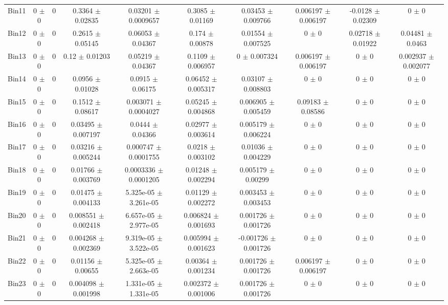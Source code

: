 \begin{tabular}{@{\extracolsep{4pt}}lccccccccc@{}}
     Bin11 & 0 $\pm$ 0 & 0 & 0.3364 $\pm$ 0.02835 & 0.03201 $\pm$ 0.0009657 & 0.3085 $\pm$ 0.01169 & 0.03453 $\pm$ 0.009766 & 0.006197 $\pm$ 0.006197 & -0.0128 $\pm$ 0.02309 & 0 $\pm$ 0 \\ 
     Bin12 & 0 $\pm$ 0 & 0 & 0.2615 $\pm$ 0.05145 & 0.06053 $\pm$ 0.04367 & 0.174 $\pm$ 0.00878 & 0.01554 $\pm$ 0.007525 & 0 $\pm$ 0 & 0.02718 $\pm$ 0.01922 & 0.04481 $\pm$ 0.0463 \\ 
     Bin13 & 0 $\pm$ 0 & 0 & 0.12 $\pm$ 0.01203 & 0.05219 $\pm$ 0.04367 & 0.1109 $\pm$ 0.006957 & 0 $\pm$ 0.007324 & 0.006197 $\pm$ 0.006197 & 0 $\pm$ 0 & 0.002937 $\pm$ 0.002077 \\ 
     Bin14 & 0 $\pm$ 0 & 0 & 0.0956 $\pm$ 0.01028 & 0.0915 $\pm$ 0.06175 & 0.06452 $\pm$ 0.005317 & 0.03107 $\pm$ 0.008803 & 0 $\pm$ 0 & 0 $\pm$ 0 & 0 $\pm$ 0 \\ 
     Bin15 & 0 $\pm$ 0 & 0 & 0.1512 $\pm$ 0.08617 & 0.003071 $\pm$ 0.0004027 & 0.05245 $\pm$ 0.004868 & 0.006905 $\pm$ 0.005459 & 0.09183 $\pm$ 0.08586 & 0 $\pm$ 0 & 0 $\pm$ 0 \\ 
     Bin16 & 0 $\pm$ 0 & 0 & 0.03495 $\pm$ 0.007197 & 0.0444 $\pm$ 0.04366 & 0.02977 $\pm$ 0.003614 & 0.005179 $\pm$ 0.006224 & 0 $\pm$ 0 & 0 $\pm$ 0 & 0 $\pm$ 0 \\ 
     Bin17 & 0 $\pm$ 0 & 0 & 0.03216 $\pm$ 0.005244 & 0.000747 $\pm$ 0.0001755 & 0.0218 $\pm$ 0.003102 & 0.01036 $\pm$ 0.004229 & 0 $\pm$ 0 & 0 $\pm$ 0 & 0 $\pm$ 0 \\ 
     Bin18 & 0 $\pm$ 0 & 0 & 0.01766 $\pm$ 0.003769 & 0.0003336 $\pm$ 0.0001205 & 0.01248 $\pm$ 0.002294 & 0.005179 $\pm$ 0.00299 & 0 $\pm$ 0 & 0 $\pm$ 0 & 0 $\pm$ 0 \\ 
     Bin19 & 0 $\pm$ 0 & 0 & 0.01475 $\pm$ 0.004133 & 5.325e-05 $\pm$ 3.261e-05 & 0.01129 $\pm$ 0.002272 & 0.003453 $\pm$ 0.003453 & 0 $\pm$ 0 & 0 $\pm$ 0 & 0 $\pm$ 0 \\ 
     Bin20 & 0 $\pm$ 0 & 0 & 0.008551 $\pm$ 0.002418 & 6.657e-05 $\pm$ 2.977e-05 & 0.006824 $\pm$ 0.001693 & 0.001726 $\pm$ 0.001726 & 0 $\pm$ 0 & 0 $\pm$ 0 & 0 $\pm$ 0 \\ 
     Bin21 & 0 $\pm$ 0 & 0 & 0.004268 $\pm$ 0.002369 & 9.319e-05 $\pm$ 3.522e-05 & 0.005994 $\pm$ 0.001623 & -0.001726 $\pm$ 0.001726 & 0 $\pm$ 0 & 0 $\pm$ 0 & 0 $\pm$ 0 \\ 
     Bin22 & 0 $\pm$ 0 & 0 & 0.01156 $\pm$ 0.00655 & 5.325e-05 $\pm$ 2.663e-05 & 0.00364 $\pm$ 0.001234 & 0.001726 $\pm$ 0.001726 & 0.006197 $\pm$ 0.006197 & 0 $\pm$ 0 & 0 $\pm$ 0 \\ 
     Bin23 & 0 $\pm$ 0 & 0 & 0.004098 $\pm$ 0.001998 & 1.331e-05 $\pm$ 1.331e-05 & 0.002372 $\pm$ 0.001006 & 0.001726 $\pm$ 0.001726 & 0 $\pm$ 0 & 0 $\pm$ 0 & 0 $\pm$ 0 \\ 

\end{tabular}
